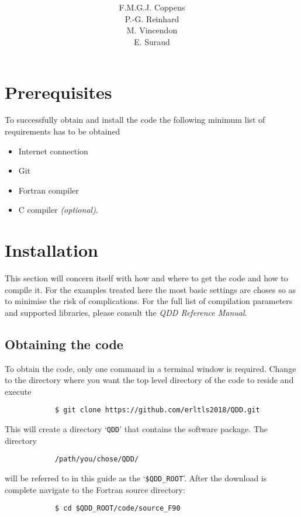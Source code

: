 \documentclass[11pt,a4paper]{article}
\title{\fontsize{50}{60}\selectfont{Quantum Dissipative Dynamics}\\\vspace{7ex}\fontsize{50}{60}\selectfont{\textsf{User manual}}\vspace{8ex}}
\author{F.M.G.J. Coppens\\P.-G. Reinhard\\M. Vincendon\\E. Suraud}
\begin{document}
	\maketitle
	\thispagestyle{empty}
	\newpage
	\begingroup
		\hypersetup{hidelinks}
		\tableofcontents
	\endgroup
	\newpage

	\section{Prerequisites}
		To successfully obtain and install the code the following minimum list of requirements has to be obtained
		\begin{itemize}
			\item Internet connection
			\item Git
			\item Fortran compiler
			\item C compiler \textit{(optional)}.
		\end{itemize}	

	\section{Installation}	
		This section will concern itself with how and where to get the code and how to compile it. For the examples treated here the most basic settings are choses so as to minimise the risk of complications. For the full list of compilation parameters and supported libraries, please consult the \textit{QDD Reference Manual}.
		\subsection{Obtaining the code}
			To obtain the code, only one command in a terminal window is required. Change to the directory where you want the top level directory of the code to reside and execute
		\begin{verbatim}
			$ git clone https://github.com/erltls2018/QDD.git
		\end{verbatim}
		This will create a directory `\texttt{QDD}' that contains the software package. The directory
		\begin{verbatim}
			/path/you/chose/QDD/
		\end{verbatim}
		will be referred to in this guide as the `\texttt{\$QDD\_ROOT}'. After the download is complete navigate to the Fortran source directory:
		\begin{verbatim}
			$ cd $QDD_ROOT/code/source_F90
		\end{verbatim}
		
\end{document}
